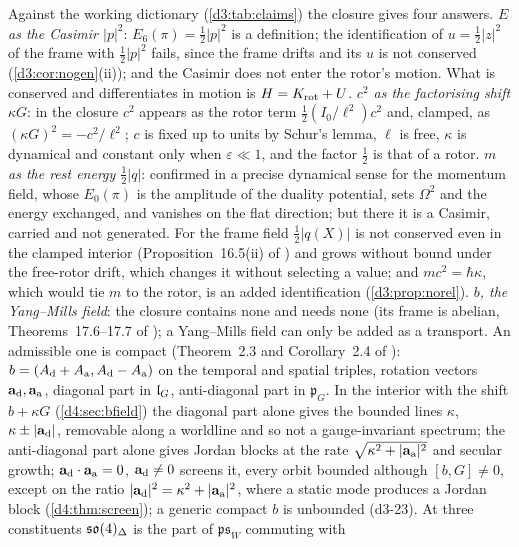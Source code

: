 Against the working dictionary (\cref{d3:tab:claims}) the closure gives four answers. \emph{$E$ as the Casimir $|p|^2$}: $E_6(\pi)=\tfrac12|p|^2$ is a
definition; the identification of $u=\tfrac12|z|^2$ of the frame with $\tfrac12|p|^2$ fails, since the frame drifts and its $u$ is not conserved
(\cref{d3:cor:nogen}(ii)); and the Casimir does not enter the rotor's motion. What is conserved and differentiates in motion is $H=K_{\rm rot}+U$.
\emph{$c^2$ as the factorising shift $\kappa G$}: in the closure $c^2$ appears as the rotor term $\tfrac12(I_0/\ell^2)c^2$ and, clamped, as
$(\kappa G)^2=-c^2/\ell^2$; $c$ is fixed up to units by Schur's lemma, $\ell$ is free, $\kappa$ is dynamical and constant only when $\varepsilon\ll1$, and
the factor $\tfrac12$ is that of a rotor. \emph{$m$ as the rest energy $\tfrac12|q|$}: confirmed in a precise dynamical sense for the momentum
field, whose $E_0(\pi)$ is the amplitude of the duality potential, sets $\Omega^2$ and the energy exchanged, and vanishes on the flat direction; but
there it is a Casimir, carried and not generated. For the frame field $\tfrac12|q(X)|$ is not conserved even in the clamped interior
(Proposition~16.5(ii) of \cite{ES17}) and grows without bound under the free-rotor drift, which changes it without selecting a value; and
$mc^2=\hbar\kappa$, which would tie $m$ to the rotor, is an added identification (\cref{d3:prop:norel}). \emph{$b$, the Yang--Mills field}: the closure
contains none and needs none (its frame is abelian, Theorems~17.6--17.7 of \cite{ES17}); a Yang--Mills field can only be added as a
transport. An admissible one is compact (Theorem~2.3 and Corollary~2.4 of \cite{ES17}): $b=(A_{\rm d}+A_{\rm a},A_{\rm d}-A_{\rm a})$ on the
temporal and spatial triples, rotation vectors $\mathbf a_{\rm d},\mathbf a_{\rm a}$, diagonal part in $\mathfrak l_G$, anti-diagonal part in $\mathfrak p_G$. In the
interior with the shift $b+\kappa G$ (\cref{d4:sec:bfield}) the diagonal part alone gives the bounded lines $\kappa$, $\kappa\pm|\mathbf a_{\rm d}|$, removable along a
worldline \cite{Larmor1897} and so not a gauge-invariant spectrum; the anti-diagonal part alone gives Jordan blocks at the rate
$\sqrt{\kappa^2+|\mathbf a_{\rm a}|^2}$ and secular growth; $\mathbf a_{\rm d}\cdot\mathbf a_{\rm a}=0$, $\mathbf a_{\rm d}\neq0$ screens it, every orbit bounded
although $[b,G]\neq0$, except on the ratio $|\mathbf a_{\rm d}|^2=\kappa^2+|\mathbf a_{\rm a}|^2$, where a static mode produces a Jordan block
(\cref{d4:thm:screen}); a generic compact $b$ is unbounded (d3-23). At three constituents $\mathfrak{so}(4)_\Delta$ is the part of $\mathfrak{ps}_W$ commuting with
